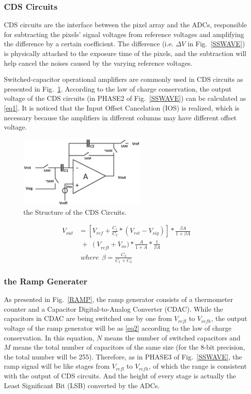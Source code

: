 \documentclass[conference]{IEEEtran}
\begin{document}
\subsubsection{CDS Circuits}

CDS circuits are the interface between the pixel array and the ADCs, responsible for subtracting the pixels’ signal voltages from reference voltages and amplifying the difference by a certain coefficient. The difference (i.e. $\Delta{V}$ in Fig.~\ref{SSWAVE}) is physically attached to the exposure time of the pixels, and the subtraction will help cancel the noises caused by the varying reference voltages. 

Switched-capacitor operational amplifiers are commonly used in CDS circuits as presented in Fig.~\ref{CDS}. According to the law of charge conservation, the output voltage of the CDS circuits (in PHASE2 of Fig.~\ref{SSWAVE}) can be calculated as \eqref{eq1}. It is noticed that the Input Offset Cancelation (IOS) is realized, which is necessary because the amplifiers in different columns may have different offset voltage.
\begin{figure}[htbp]
	\centerline{\includegraphics[width=2.5in]{./Figures/CDS.eps}}
	\caption{the Structure of the CDS Circuits.}
	\label{CDS}
\end{figure} 
\begin{equation}
\begin{aligned}
	V_{out}&=\left[ V_{ref}+\frac{C_1}{C_2}\ast\left(V_{rst}-V_{sig}\right)\right]\ast\frac{\beta A}{1+\beta A}\\
	 &\;{+}\;\left(V\right._{refl}+V_{os})\ast\frac{A}{1+A}\ast\frac{1}{\beta A}\\
	 &\;where\ \ \beta=\frac{C_2}{C_1+C_2}
	\label{eq1}
\end{aligned}
\end{equation}

\subsubsection{the Ramp Generater}

As presented in Fig.~\ref{RAMP}, the ramp generator consists of a thermometer counter and a Capacitor Digital-to-Analog Converter (CDAC). While the capacitors in CDAC are being switched one by one from $V_{refl}$ to $V_{vefh}$, the output voltage of the ramp generator will be as \eqref{eq2} according to the law of charge conservation. In this equation, $N$ means the number of switched capacitors and $M$ means the total number of capacitors of the same size (for the 8-bit precision, the total number will be 255). Therefore, as in PHASE3 of Fig.~\ref{SSWAVE}, the ramp signal will be like stages from $V_{refl}$ to $V_{refh}$, of which the range is consistent with the output of CDS circuits. And the height of every stage is actually the Least Significant Bit (LSB) converted by the ADCs.
 
\end{document}
